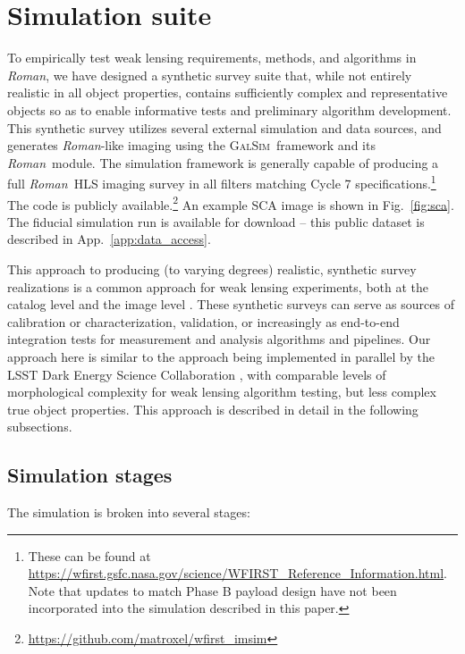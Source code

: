 \documentclass[usenatbib]{mnras}
\newcommand{\galsim}{\textsc{GalSim}}
\newcommand{\wfirst}{{\slshape Roman}}
\begin{document}
\section{Simulation suite}\label{sec:sim}

To empirically test weak lensing requirements, methods, and algorithms in \wfirst, we have designed a synthetic survey suite that, while not entirely realistic in all object properties, contains sufficiently complex and representative objects so as to enable informative tests and preliminary algorithm development. 
This synthetic survey utilizes several external simulation and data sources, and generates \wfirst-like imaging using the \galsim\ framework and its \wfirst\ module. 
The simulation framework is generally capable of producing a full \wfirst\ HLS imaging survey in all filters matching Cycle 7 specifications.\footnote{These can be found at \url{https://wfirst.gsfc.nasa.gov/science/WFIRST_Reference_Information.html}. Note that updates to match Phase B payload design have not been incorporated into the simulation described in this paper.} 
The code is publicly available.\footnote{\url{https://github.com/matroxel/wfirst_imsim}} An example SCA image is shown in Fig.~\ref{fig:sca}. The fiducial simulation run is available for download -- this public dataset is described in App.~\ref{app:data_access}.

This approach to producing (to varying degrees) realistic, synthetic survey realizations is a common approach for weak lensing experiments, both at the catalog level \citep{2018MNRAS.480.4614M,2019arXiv190706530K} and the image level \citep{2016MNRAS.457..786S,2017MNRAS.467.1627F,2018MNRAS.481.3170M,2018MNRAS.475.4524S}. These synthetic surveys can serve as sources of calibration or characterization, validation, or increasingly as end-to-end integration tests for measurement and analysis algorithms and pipelines. Our approach here is similar to the approach being implemented in parallel by the LSST Dark Energy Science Collaboration \citep[DESC;][]{2019arXiv190706530K,dc2all}, with comparable levels of morphological complexity for weak lensing algorithm testing, but less complex true object properties. This approach is described in detail in the following subsections.

\subsection{Simulation stages}\label{stages}

The simulation is broken into several stages:
\end{document}
